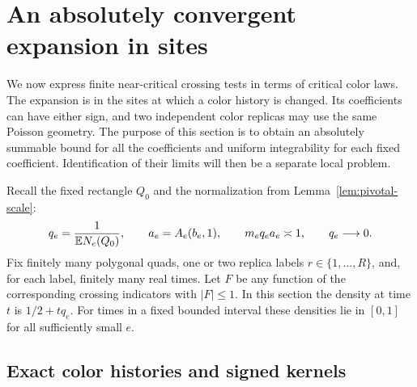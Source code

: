 \section{An absolutely convergent expansion in sites}
\label{sec:expansion}

We now express finite near-critical crossing tests in terms of critical
color laws.  The expansion is in the sites at which a color history is
changed.  Its coefficients can have either sign, and two independent
color replicas may use the same Poisson geometry.  The purpose of this
section is to obtain an absolutely summable bound for all the
coefficients and uniform integrability for each fixed coefficient.
Identification of their limits will then be a separate local problem.

Recall the fixed rectangle $Q_0$ and the normalization from
Lemma~\ref{lem:pivotal-scale}:
\begin{equation}
 q_e=\frac1{\mathbb E N_e(Q_0)},\qquad
 a_e=A_e(b_e,1),\qquad m_eq_ea_e\asymp1,
 \qquad q_e\longrightarrow0.
 \label{eq:auxiliary-scale}
\end{equation}
Fix finitely many polygonal quads, one or two replica labels
$r\in\{1,\ldots,R\}$, and, for each label, finitely many real times.
Let $F$ be any function of the corresponding crossing indicators with
$|F|\leq1$.  In this section the density at time $t$ is
$1/2+tq_e$.  For times in a fixed bounded interval these densities lie
in $[0,1]$ for all sufficiently small $e$.

\subsection{Exact color histories and signed kernels}

